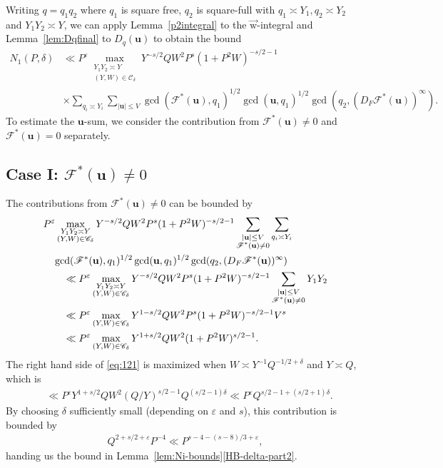 \documentclass[letterpaper,11pt]{amsart}
\numberwithin{equation}{section}
\theoremstyle{definition}
\numberwithin{equation}{section}
\newcommand{\uu}{\mathbf{u}}
\newcommand{\uw}{{\vec{\mathrm{w}}}}
\def\scrF{{\mathcal F}}
\newcommand{\ve}{\varepsilon}
\begin{document}
 	   	   Writing $q=q_1q_2$ where $q_1$ is square free, $q_2$ is square-full with $q_1\asymp Y_1, q_2\asymp Y_2$ and $Y_1Y_2\asymp Y$, we can apply  
	  Lemma~\ref{p2integral} to the $\uw$-integral and Lemma~\ref{lem:Dqfinal} to $D_q(\uu)$ to obtain the bound
  \begin{align*}%
  N_1(P, \delta)
  &\ll P^\varepsilon \max_{\substack{Y_1Y_2\asymp Y\\ (Y, W)\in \mathcal C_\delta}}Y^{-s/2}QW^2P^s(1+P^2W)^{-s/2-1}\\
  &\times\sum_{q_i\asymp Y_i}\sum_{|\uu|\leq V}\gcd(\scrF^*(\uu),q_1)^{1/2}\gcd(\uu,q_1)^{1/2}\gcd(q_2,(D_F\scrF^*(\uu))^\infty).
  \end{align*}
 To estimate the $\uu$-sum, we consider the contribution from $\scrF^*(\uu)\not=0$ and $\scrF^*(\uu)= 0$ separately. 
  \subsection{Case I: $\mathcal F^*(\uu)\not=0$}The contributions from $\mathcal F^*(\uu)\not=0$ can be bounded by
\begin{align}\nonumber
\MoveEqLeft P^\varepsilon \max_{\substack{Y_1Y_2\asymp Y\\ (Y, W)\in \mathcal C_\delta}} Y^{-s/2}QW^2P^s(1+P^2W)^{-s/2-1} \sum_{\substack{|\uu|\leq V\\ \scrF^*(\uu)\neq 0}}\sum_{q_i\asymp Y_i}\\\nonumber
\MoveEqLeft[1]\gcd(\scrF^*(\uu),q_1)^{1/2} \gcd(\uu,q_1)^{1/2}\gcd(q_2,(D_F\scrF^*(\uu))^\infty)\\ \nonumber
&\ll P^\varepsilon \max_{\substack{Y_1Y_2\asymp Y\\ (Y, W)\in \mathcal C_\delta}} Y^{-s/2}QW^2P^s(1+P^2W)^{-s/2-1} \sum_{\substack{|\uu|\leq V\\ \scrF^*(\uu)\neq 0}}Y_1Y_2\\ \nonumber
&\ll  P^\varepsilon \max_{\substack{ (Y, W)\in \mathcal C_\delta}} Y^{1-s/2}QW^2P^s(1+P^2W)^{-s/2-1}V^s\\
&\ll  P^\varepsilon \max_{\substack{(Y, W)\in \mathcal C_\delta}}  Y^{1+s/2}QW^2 (1+P^2W)^{s/2-1}.\label{eq:121}
\end{align}
The right hand side of \eqref{eq:121} is maximized when $W\asymp Y^{-1}Q^{-1/2+\delta}$ and $Y\asymp Q$, which is
\begin{align*}
    &\ll  P^{\varepsilon}   Y^{1+s/2}QW^2 (Q/Y)^{s/2-1}Q^{(s/2-1)\delta}\ll  P^\varepsilon  Q^{s/2-1+(s/2+1)\delta}.
\end{align*}
By choosing $\delta$ sufficiently small (depending on $\varepsilon$ and $s$),
this contribution is bounded by 
\begin{align*}
Q^{2+s/2+\ve}P^{-4}\ll P^{s-4-(s-8)/3+\ve},
\end{align*}
handing us the bound in Lemma~\ref{lem:Ni-bounds}\eqref{HB-delta-part2}. 
\end{document}
